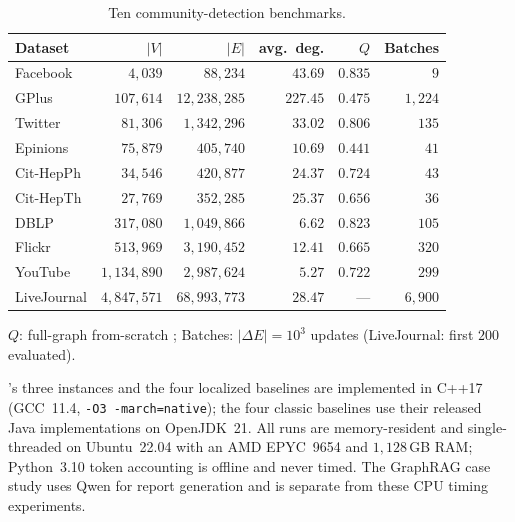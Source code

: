 \begin{table}[b]\centering
\caption{Ten community-detection benchmarks.}
\label{tab:datasets}
\begin{footnotesize}
\setlength{\tabcolsep}{0.4em}
\begin{tabular}{lrrrrr}
\toprule
Dataset & $|V|$ & $|E|$ & avg.\ deg. & $Q$ & Batches \\
\midrule
Facebook    & $4{,}039$     & $88{,}234$      & $43.69$  & $0.835$ & $9$ \\
GPlus       & $107{,}614$   & $12{,}238{,}285$& $227.45$ & $0.475$ & $1{,}224$ \\
Twitter     & $81{,}306$    & $1{,}342{,}296$ & $33.02$  & $0.806$ & $135$ \\
Epinions    & $75{,}879$    & $405{,}740$     & $10.69$  & $0.441$ & $41$ \\
Cit-HepPh   & $34{,}546$    & $420{,}877$     & $24.37$  & $0.724$ & $43$ \\
Cit-HepTh   & $27{,}769$    & $352{,}285$     & $25.37$  & $0.656$ & $36$ \\
DBLP        & $317{,}080$   & $1{,}049{,}866$ & $6.62$   & $0.823$ & $105$ \\
Flickr      & $513{,}969$   & $3{,}190{,}452$ & $12.41$  & $0.665$ & $320$ \\
YouTube     & $1{,}134{,}890$&$2{,}987{,}624$ & $5.27$   & $0.722$ & $299$ \\
LiveJournal & $4{,}847{,}571$&$68{,}993{,}773$& $28.47$  & ---     & $6{,}900$ \\
\bottomrule
\end{tabular}
\par\smallskip\raggedright
$Q$: full-graph from-scratch \Louvain{}; Batches: $|\Delta E|=10^3$ updates
(LiveJournal: first $200$ evaluated).
\end{footnotesize}
\end{table}


 \DyLo{}'s three instances and the four localized baselines
are implemented in C++17 (GCC~11.4,
\texttt{-O3 -march=native}); the four classic baselines use their released Java
implementations on OpenJDK~21. All runs are memory-resident and single-threaded
on Ubuntu~22.04 with an AMD EPYC~9654 and $1{,}128$\,GB RAM; Python~3.10 token
accounting is offline and never timed. The GraphRAG case study uses Qwen
for report generation and is separate from these CPU timing experiments.



